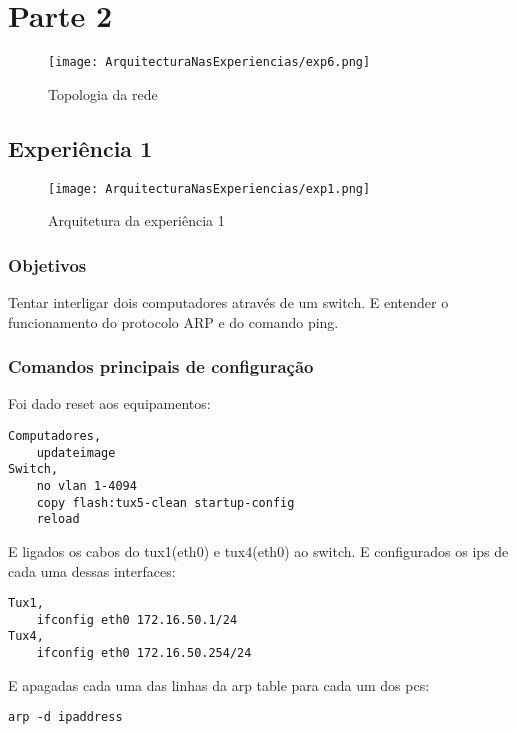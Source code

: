 \documentclass[a4paper]{article}
\begin{document}
\section{Parte 2}

\begin{figure}[h]
    \centering
    \texttt{[image: ArquitecturaNasExperiencias/exp6.png]}
    \caption{Topologia da rede}
\end{figure}

\subsection{Experiência 1}

\begin{figure}[h]
    \centering
    \texttt{[image: ArquitecturaNasExperiencias/exp1.png]}
    \caption{Arquitetura da experiência 1}
\end{figure}

\subsubsection{Objetivos}
Tentar interligar dois computadores através de um switch. E entender o funcionamento do protocolo ARP e do comando ping.

\subsubsection{Comandos principais de configuração}
Foi dado reset aos equipamentos:
\begin{verbatim}
Computadores,
    updateimage
Switch,
    no vlan 1-4094
    copy flash:tux5-clean startup-config
    reload
\end{verbatim}

E ligados os cabos do tux1(eth0) e tux4(eth0) ao switch. E configurados os ips de cada uma dessas interfaces:
\begin{verbatim}
Tux1,
    ifconfig eth0 172.16.50.1/24
Tux4,
    ifconfig eth0 172.16.50.254/24
\end{verbatim}

E apagadas cada uma das linhas da arp table para cada um dos pcs:
\begin{verbatim}
arp -d ipaddress
\end{verbatim}
\end{document}
